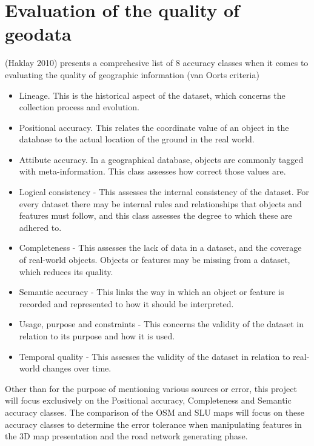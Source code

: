 \documentclass[a4paper]{article}
\begin{document}
\section{Evaluation of the quality of geodata}

(Haklay 2010) presents a comprehesive list of 8 accuracy classes when it comes to evaluating the quality of geographic information (van Oorts criteria)

\begin{itemize}
  \item Lineage. This is the historical aspect of the dataset, which concerns the collection process and evolution.
  \item Positional accuracy. This relates the coordinate value of an object in the database to the actual location of the ground in the real world.
  \item Attibute accuracy. In a geographical database, objects are commonly tagged with meta-information. This class assesses how correct those values are.
  \item Logical consistency - This assesses the internal consistency of the dataset. For every dataset there may be internal rules and relationships that objects and features must follow, and this class assesses the degree to which these are adhered to.
  \item Completeness - This assesses the lack of data in a dataset, and the coverage of real-world objects. Objects or features may be missing from a dataset, which reduces its quality.
  \item Semantic accuracy - This links the way in which an object or feature is recorded and represented to how it should be interpreted.
  \item Usage, purpose and constraints - This concerns the validity of the dataset in relation to its purpose and how it is used.
  \item Temporal quality - This assesses the validity of the dataset in relation to real-world changes over time.
\end{itemize}

Other than for the purpose of mentioning various sources or error, this project will focus exclusively on the Positional accuracy, Completeness and Semantic accuracy classes. The comparison of the OSM and SLU maps will focus on these accuracy classes to determine the error tolerance when manipulating features in the 3D map presentation and the road network generating phase.
\end{document}
